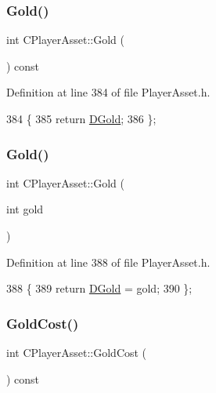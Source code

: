 \subsubsection{\texorpdfstring{Gold()}{Gold()}\hspace{0.1cm}{\footnotesize\ttfamily [1/2]}}
{\footnotesize\ttfamily int C\+Player\+Asset\+::\+Gold (\begin{DoxyParamCaption}{ }\end{DoxyParamCaption}) const\hspace{0.3cm}{\ttfamily [inline]}}



Definition at line 384 of file Player\+Asset.\+h.


\begin{DoxyCode}
384                         \{
385             \textcolor{keywordflow}{return} \hyperlink{classCPlayerAsset_ab90ebdc73c6794fd44ddbe273f610292}{DGold};
386         \};
\end{DoxyCode}
\hypertarget{classCPlayerAsset_a97976cb3f9db851ecaf2a78c268dce32}{}\label{classCPlayerAsset_a97976cb3f9db851ecaf2a78c268dce32} 
\subsubsection{\texorpdfstring{Gold()}{Gold()}\hspace{0.1cm}{\footnotesize\ttfamily [2/2]}}
{\footnotesize\ttfamily int C\+Player\+Asset\+::\+Gold (\begin{DoxyParamCaption}\item[{int}]{gold }\end{DoxyParamCaption})\hspace{0.3cm}{\ttfamily [inline]}}



Definition at line 388 of file Player\+Asset.\+h.


\begin{DoxyCode}
388                           \{
389             \textcolor{keywordflow}{return} \hyperlink{classCPlayerAsset_ab90ebdc73c6794fd44ddbe273f610292}{DGold} = gold;
390         \};
\end{DoxyCode}
\hypertarget{classCPlayerAsset_aa27a1ef30ef9f6a0452f7eeea6ae9516}{}\label{classCPlayerAsset_aa27a1ef30ef9f6a0452f7eeea6ae9516} 
\subsubsection{\texorpdfstring{Gold\+Cost()}{GoldCost()}}
{\footnotesize\ttfamily int C\+Player\+Asset\+::\+Gold\+Cost (\begin{DoxyParamCaption}{ }\end{DoxyParamCaption}) const\hspace{0.3cm}{\ttfamily [inline]}}



